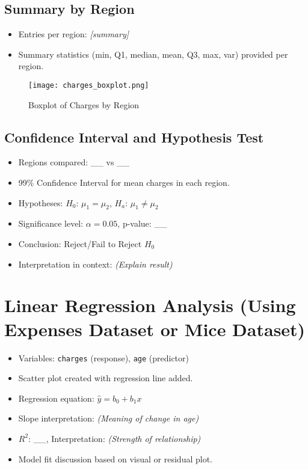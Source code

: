 \documentclass{article}
\begin{document}
\subsection{Summary by Region}
\begin{itemize}
    \item Entries per region: \textit{[summary]}
    \item Summary statistics (min, Q1, median, mean, Q3, max, var) provided per region.
\end{itemize}

\begin{figure}[H]
    \centering
    \texttt{[image: charges\_boxplot.png]} %
    \caption{Boxplot of Charges by Region}
\end{figure}

\subsection{Confidence Interval and Hypothesis Test}
\begin{itemize}
    \item Regions compared: \_\_ vs \_\_
    \item 99\% Confidence Interval for mean charges in each region.
    \item Hypotheses: \(H_0\): \(\mu_1 = \mu_2\), \(H_a\): \(\mu_1 \neq \mu_2\)
    \item Significance level: \(\alpha = 0.05\), p-value: \_\_
    \item Conclusion: Reject/Fail to Reject \(H_0\)
    \item Interpretation in context: \textit{(Explain result)}
\end{itemize}

\section{Linear Regression Analysis (Using Expenses Dataset or Mice Dataset)}

\begin{itemize}
    \item Variables: \texttt{charges} (response), \texttt{age} (predictor)
    \item Scatter plot created with regression line added.
    \item Regression equation: \(\hat{y} = b_0 + b_1x\)
    \item Slope interpretation: \textit{(Meaning of change in age)}
    \item \(R^2\): \_\_, Interpretation: \textit{(Strength of relationship)}
    \item Model fit discussion based on visual or residual plot.
\end{itemize}
\end{document}
